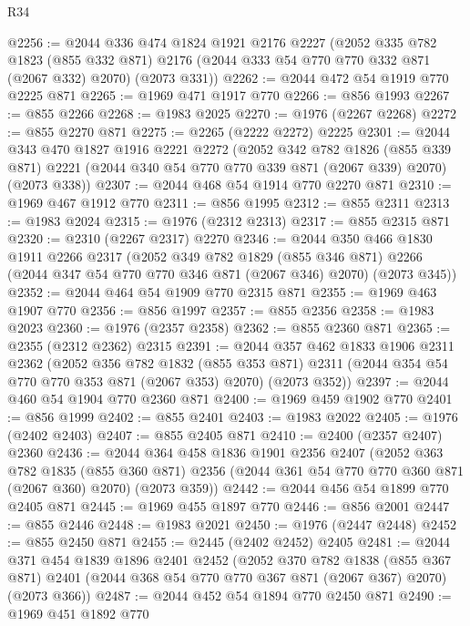 \begin{lexlean}{R34}
\begin{coremodule}
@2256 := @2044
    @336
    @474
    @1824
    @1921
    @2176
    @2227
    (@2052
      @335
      @782
      @1823
      (@855 @332 @871)
      @2176
      (@2044 @333 @54 @770 @770 @332 @871 (@2067 @332) @2070)
      (@2073 @331))
@2262 := @2044 @472 @54 @1919 @770 @2225 @871
@2265 := @1969 @471 @1917 @770
@2266 := @856 @1993
@2267 := @855 @2266
@2268 := @1983 @2025
@2270 := @1976 (@2267 @2268)
@2272 := @855 @2270 @871
@2275 := @2265 (@2222 @2272) @2225
@2301 := @2044
    @343
    @470
    @1827
    @1916
    @2221
    @2272
    (@2052
      @342
      @782
      @1826
      (@855 @339 @871)
      @2221
      (@2044 @340 @54 @770 @770 @339 @871 (@2067 @339) @2070)
      (@2073 @338))
@2307 := @2044 @468 @54 @1914 @770 @2270 @871
@2310 := @1969 @467 @1912 @770
@2311 := @856 @1995
@2312 := @855 @2311
@2313 := @1983 @2024
@2315 := @1976 (@2312 @2313)
@2317 := @855 @2315 @871
@2320 := @2310 (@2267 @2317) @2270
@2346 := @2044
    @350
    @466
    @1830
    @1911
    @2266
    @2317
    (@2052
      @349
      @782
      @1829
      (@855 @346 @871)
      @2266
      (@2044 @347 @54 @770 @770 @346 @871 (@2067 @346) @2070)
      (@2073 @345))
@2352 := @2044 @464 @54 @1909 @770 @2315 @871
@2355 := @1969 @463 @1907 @770
@2356 := @856 @1997
@2357 := @855 @2356
@2358 := @1983 @2023
@2360 := @1976 (@2357 @2358)
@2362 := @855 @2360 @871
@2365 := @2355 (@2312 @2362) @2315
@2391 := @2044
    @357
    @462
    @1833
    @1906
    @2311
    @2362
    (@2052
      @356
      @782
      @1832
      (@855 @353 @871)
      @2311
      (@2044 @354 @54 @770 @770 @353 @871 (@2067 @353) @2070)
      (@2073 @352))
@2397 := @2044 @460 @54 @1904 @770 @2360 @871
@2400 := @1969 @459 @1902 @770
@2401 := @856 @1999
@2402 := @855 @2401
@2403 := @1983 @2022
@2405 := @1976 (@2402 @2403)
@2407 := @855 @2405 @871
@2410 := @2400 (@2357 @2407) @2360
@2436 := @2044
    @364
    @458
    @1836
    @1901
    @2356
    @2407
    (@2052
      @363
      @782
      @1835
      (@855 @360 @871)
      @2356
      (@2044 @361 @54 @770 @770 @360 @871 (@2067 @360) @2070)
      (@2073 @359))
@2442 := @2044 @456 @54 @1899 @770 @2405 @871
@2445 := @1969 @455 @1897 @770
@2446 := @856 @2001
@2447 := @855 @2446
@2448 := @1983 @2021
@2450 := @1976 (@2447 @2448)
@2452 := @855 @2450 @871
@2455 := @2445 (@2402 @2452) @2405
@2481 := @2044
    @371
    @454
    @1839
    @1896
    @2401
    @2452
    (@2052
      @370
      @782
      @1838
      (@855 @367 @871)
      @2401
      (@2044 @368 @54 @770 @770 @367 @871 (@2067 @367) @2070)
      (@2073 @366))
@2487 := @2044 @452 @54 @1894 @770 @2450 @871
@2490 := @1969 @451 @1892 @770

\end{coremodule}
\end{lexlean}
